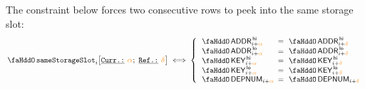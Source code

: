 The constraint below forces two consecutive rows to peek into the same storage slot:
\[
	\stoSameStorageSlot {i}{\reluo}{\reldo}
	\iff
	\left\{ \begin{array}{lcl}
		\stoAddressHi	      _{i + \reluo} & \!\!\! = \!\!\! & \stoAddressHi	      _{i + \reldo} \\
		\stoAddressLo	      _{i + \reluo} & \!\!\! = \!\!\! & \stoAddressLo	      _{i + \reldo} \\
		\stoKeyHi	      _{i + \reluo} & \!\!\! = \!\!\! & \stoKeyHi	      _{i + \reldo} \\
		\stoKeyLo	      _{i + \reluo} & \!\!\! = \!\!\! & \stoKeyLo	      _{i + \reldo} \\
		\stoDeploymentNumber  _{i + \reluo} & \!\!\! = \!\!\! & \stoDeploymentNumber  _{i + \reldo} \\
	\end{array} \right.
\]

